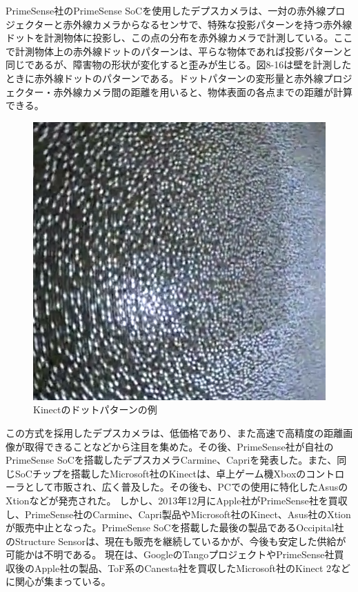 PrimeSense社のPrimeSense SoCを使用したデプスカメラは、一対の赤外線プロジェクターと赤外線カメラからなるセンサで、特殊な投影パターンを持つ赤外線ドットを計測物体に投影し、この点の分布を赤外線カメラで計測している。ここで計測物体上の赤外線ドットのパターンは、平らな物体であれば投影パターンと同じであるが、障害物の形状が変化すると歪みが生じる。図8-16は壁を計測したときに赤外線ドットのパターンである。ドットパターンの変形量と赤外線プロジェクター・赤外線カメラ間の距離を用いると、物体表面の各点までの距離が計算できる。

\begin{figure}[ht]
  \centering
  \includegraphics[width=\columnwidth]{pictures/chapter8/pic_08_15.png}
  \caption{Kinectのドットパターンの例}
\end{figure}


この方式を採用したデプスカメラは、低価格であり、また高速で高精度の距離画像が取得できることなどから注目を集めた。その後、PrimeSense社が自社のPrimeSense SoCを搭載したデプスカメラCarmine、Capriを発表した。また、同じSoCチップを搭載したMicrosoft社のKinectは、卓上ゲーム機Xboxのコントローラとして市販され、広く普及した。その後も、PCでの使用に特化したAsusのXtionなどが発売された。
しかし、2013年12月にApple社がPrimeSense社を買収し、PrimeSense社のCarmine、Capri製品やMicrosoft社のKinect、Asus社のXtionが販売中止となった。PrimeSense SoCを搭載した最後の製品であるOccipital社のStructure Sensorは、現在も販売を継続しているかが、今後も安定した供給が可能かは不明である。
現在は、GoogleのTangoプロジェクトやPrimeSense社買収後のApple社の製品、ToF系のCanesta社を買収したMicrosoft社のKinect 2などに関心が集まっている。

